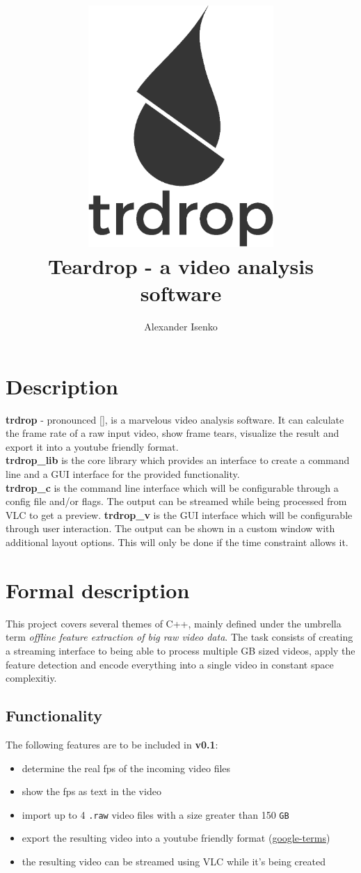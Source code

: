 \documentclass[titlepage]{article}
\title{\includegraphics[width=200pt, height=260pt]{../../images/trdrop_logo_text.eps} \\[50pt]
Teardrop - a video analysis software}
\author{Alexander Isenko}
\date{}
\begin{document}
\maketitle

\newpage

\section{Description}

\textbf{trdrop} - pronounced [\textit{}], is a marvelous video analysis software. It can calculate the frame rate of a raw input video, show frame tears, visualize the result and export it into a youtube friendly format. \\[2mm]
\hfill
\textbf{trdrop\_lib} is the core library which provides an interface to create a command line and a GUI interface for the provided functionality. \\[2mm]
\hfill
\textbf{trdrop\_c} is the command line interface which will be configurable through a config file and/or flags. The output can be streamed while being processed from VLC to get a preview.
\hfill
\textbf{trdrop\_v} is the GUI interface which will be configurable through user interaction. The output can be shown in a custom window with additional layout options. This will only be done if the time constraint allows it.

\section{Formal description}

This project covers several themes of C++, mainly defined under the umbrella term \textit{offline feature extraction of big raw video data}. The task consists of creating a streaming interface to being able to process multiple GB sized videos, apply the feature detection and encode everything into a single video in constant space complexitiy.

\subsection{Functionality}

The following features are to be included in \textbf{v0.1}:

\begin{itemize}
    \item determine the real fps of the incoming video files
    \item show the fps as text in the video
    \item import up to 4 \texttt{.raw} video files with a size greater than 150 \texttt{GB}
    \item export the resulting video into a youtube friendly format (\href{https://support.google.com/youtube/answer/1722171}{google-terms})
    \item the resulting video can be streamed using VLC while it's being created
\end{itemize}
\end{document}
